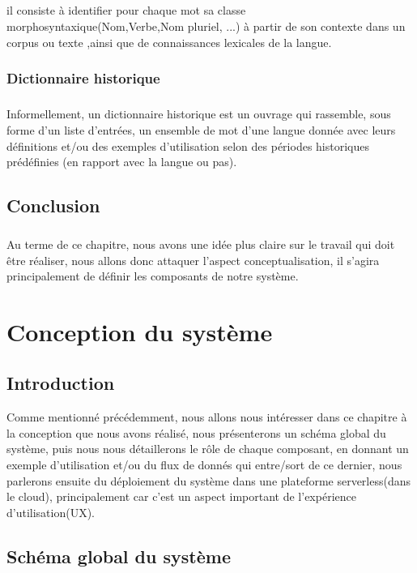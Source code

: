 \documentclass[]{report}
\begin{document}
				\paragraph{}
				il consiste à identifier pour chaque mot sa classe morphosyntaxique(Nom,Verbe,Nom pluriel, ...) à partir de son contexte dans un corpus ou texte ,ainsi que de connaissances lexicales de la langue.
			
		\subsection{Dictionnaire historique}
			\paragraph{}
			Informellement, un dictionnaire historique est un ouvrage qui rassemble, sous forme d'un liste d'entrées, un ensemble de mot d'une langue donnée avec leurs définitions et/ou des exemples d'utilisation selon des périodes historiques prédéfinies (en rapport avec la langue ou pas).
	\section{Conclusion}
	\paragraph{}
	Au terme de ce chapitre, nous avons une idée plus claire sur le travail qui doit être réaliser, nous allons donc attaquer l'aspect conceptualisation, il s'agira principalement de définir les composants de notre système.
	
\chapter{Conception du système}
	\section{Introduction}
	Comme mentionné précédemment, nous allons nous intéresser dans ce chapitre à la conception que nous avons réalisé, nous présenterons un schéma global du système, puis nous nous détaillerons le rôle de chaque composant, en donnant un exemple d'utilisation et/ou du flux de donnés qui entre/sort de ce dernier, nous parlerons ensuite du déploiement du système dans
	une plateforme serverless(dans le cloud), principalement car c'est un aspect important de l'expérience d'utilisation(UX).
	\section{Schéma global du système}
\end{document}
